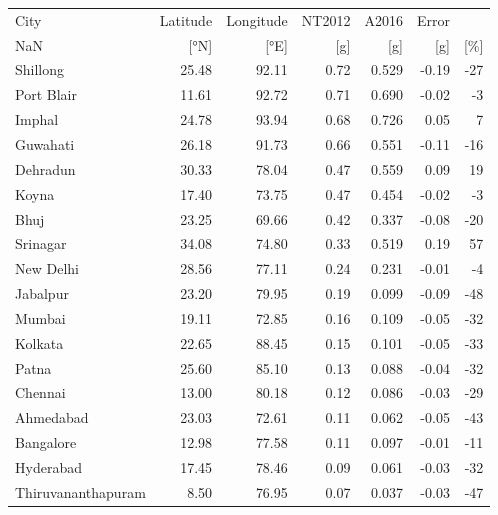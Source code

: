 \begin{tabular}{lrrrrrr}
\toprule
               City & Latitude & Longitude & NT2012 &  A2016 & Error &     \\
                NaN &     [°N] &      [°E] &    [g] &    [g] &   [g] & [\%] \\
\midrule
           Shillong &    25.48 &     92.11 &   0.72 &  0.529 & -0.19 & -27 \\
         Port Blair &    11.61 &     92.72 &   0.71 &  0.690 & -0.02 &  -3 \\
             Imphal &    24.78 &     93.94 &   0.68 &  0.726 &  0.05 &   7 \\
           Guwahati &    26.18 &     91.73 &   0.66 &  0.551 & -0.11 & -16 \\
           Dehradun &    30.33 &     78.04 &   0.47 &  0.559 &  0.09 &  19 \\
              Koyna &    17.40 &     73.75 &   0.47 &  0.454 & -0.02 &  -3 \\
               Bhuj &    23.25 &     69.66 &   0.42 &  0.337 & -0.08 & -20 \\
           Srinagar &    34.08 &     74.80 &   0.33 &  0.519 &  0.19 &  57 \\
          New Delhi &    28.56 &     77.11 &   0.24 &  0.231 & -0.01 &  -4 \\
           Jabalpur &    23.20 &     79.95 &   0.19 &  0.099 & -0.09 & -48 \\
             Mumbai &    19.11 &     72.85 &   0.16 &  0.109 & -0.05 & -32 \\
            Kolkata &    22.65 &     88.45 &   0.15 &  0.101 & -0.05 & -33 \\
              Patna &    25.60 &     85.10 &   0.13 &  0.088 & -0.04 & -32 \\
            Chennai &    13.00 &     80.18 &   0.12 &  0.086 & -0.03 & -29 \\
          Ahmedabad &    23.03 &     72.61 &   0.11 &  0.062 & -0.05 & -43 \\
          Bangalore &    12.98 &     77.58 &   0.11 &  0.097 & -0.01 & -11 \\
          Hyderabad &    17.45 &     78.46 &   0.09 &  0.061 & -0.03 & -32 \\
 Thiruvananthapuram &     8.50 &     76.95 &   0.07 &  0.037 & -0.03 & -47 \\
\bottomrule
\end{tabular}

